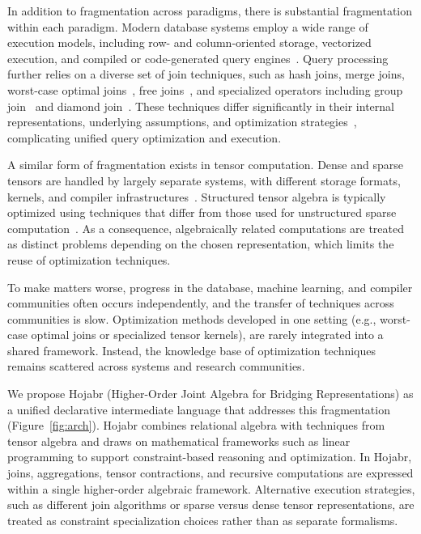 \documentclass[sigconf,nonacm]{acmart}
\begin{document}
In addition to fragmentation across paradigms, there is substantial fragmentation within each paradigm. Modern database systems employ a wide range of execution models, including row- and column-oriented storage, vectorized execution, and compiled or code-generated query engines~\cite{abadi2013design, neumann2011efficiently, boncz2005monetdb,kersten2018everything}. Query processing further relies on a diverse set of join techniques, such as hash joins, merge joins, worst-case optimal joins~\cite{ngo2014skew}, free joins~\cite{wang2023free}, and specialized operators including group join~\cite{moerkotte2011accelerating} and diamond join~\cite{birler2024robust}. These techniques differ significantly in their internal representations, underlying assumptions, and optimization strategies~\cite{birler2024robust}, complicating unified query optimization and execution.

A similar form of fragmentation exists in tensor computation. Dense and sparse tensors are handled by largely separate systems, with different storage formats, kernels, and compiler infrastructures~\cite{chen2018tvm,kjolstad2017tensor,ragan2013halide}. Structured tensor algebra is typically optimized using techniques that differ from those used for unstructured sparse computation~\cite{spampinato2016basic,ghorbani2023compiling}. As a consequence, algebraically related computations are treated as distinct problems depending on the chosen representation, which limits the reuse of optimization techniques.

To make matters worse, progress in the database, machine learning, and compiler communities often occurs independently, and the transfer of techniques across communities is slow. Optimization methods developed in one setting (e.g., worst-case optimal joins or specialized tensor kernels), are rarely integrated into a shared framework. Instead, the knowledge base of optimization techniques remains scattered across systems and research communities.

We propose Hojabr (Higher-Order Joint Algebra for Bridging Representations) as a unified declarative intermediate language that addresses this fragmentation (Figure~\ref{fig:arch}). Hojabr combines relational algebra with techniques from tensor algebra and draws on mathematical frameworks such as linear programming to support constraint-based reasoning and optimization. In Hojabr, joins, aggregations, tensor contractions, and recursive computations are expressed within a single higher-order algebraic framework. Alternative execution strategies, such as different join algorithms or sparse versus dense tensor representations, are treated as constraint specialization choices rather than as separate formalisms.
\end{document}

